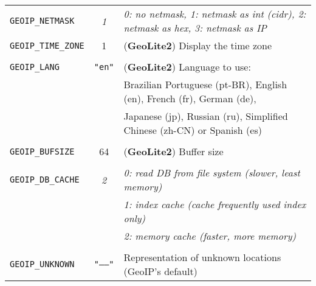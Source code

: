 \documentclass[documentation]{subfiles}
\begin{document}
\begin{longtable}{lcl}
    {\tt GEOIP\_NETMASK} & {\em 1} & {\em 0: no netmask, 1: netmask as int (cidr), 2: netmask as hex, 3: netmask as IP}\\
    {\tt GEOIP\_TIME\_ZONE} & 1 & ({\bf GeoLite2}) Display the time zone\\
    &\\
    {\tt GEOIP\_LANG} & {\tt "en"} & ({\bf GeoLite2}) Language to use:\\
                      &            & Brazilian Portuguese (pt-BR), English (en), French (fr), German (de),\\
                      &            & Japanese (jp), Russian (ru), Simplified Chinese (zh-CN) or Spanish (es)\\
    &\\
    {\tt GEOIP\_BUFSIZE} & 64 & ({\bf GeoLite2}) Buffer size\\
    &\\
    {\tt GEOIP\_DB\_CACHE} & {\em 2} & {\em 0: read DB from file system (slower, least memory)}\\
                           &   & {\em 1: index cache (cache frequently used index only)}\\
                           &   & {\em 2: memory cache (faster, more memory)}\\
    &\\
    {\tt GEOIP\_UNKNOWN} & {\tt"--{}--"} & Representation of unknown locations (GeoIP's default)\\
    \bottomrule
\end{longtable}
\end{document}
